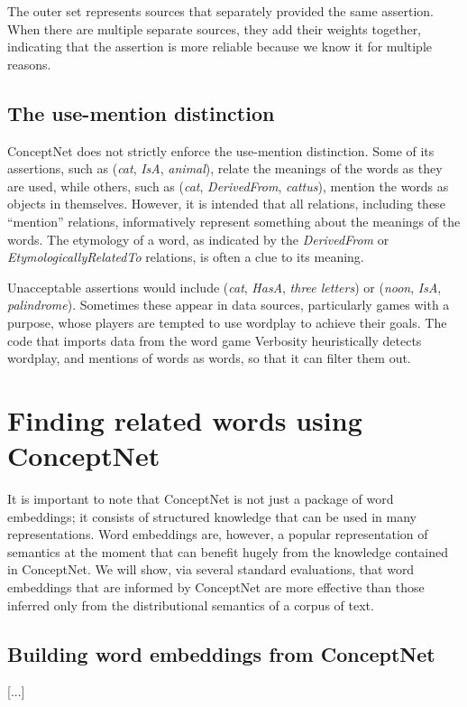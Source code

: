 \documentclass[letterpaper]{article}
\begin{document}
The outer set represents sources that separately provided the same
assertion. When there are multiple separate sources, they add their
weights together, indicating that the assertion is more reliable because
we know it for multiple reasons.


\subsection{The use-mention distinction}

ConceptNet does not strictly enforce the use-mention distinction. Some
of its assertions, such as (\emph{cat}, \emph{IsA}, \emph{animal}),
relate the meanings of the words as they are used, while others, such as
(\emph{cat}, \emph{DerivedFrom}, \emph{cattus}), mention the words as
objects in themselves. However, it is intended that all relations,
including these ``mention'' relations, informatively represent something
about the meanings of the words. The etymology of a word, as indicated
by the \emph{DerivedFrom} or \emph{EtymologicallyRelatedTo} relations,
is often a clue to its meaning.

Unacceptable assertions would include (\emph{cat}, \emph{HasA},
\emph{three letters}) or (\emph{noon}, \emph{IsA}, \emph{palindrome}).
Sometimes these appear in data sources, particularly games with a
purpose, whose players are tempted to use wordplay to achieve their
goals. The code that imports data from the word game Verbosity
heuristically detects wordplay, and mentions of words as words, so that
it can filter them out.


\section{Finding related words using ConceptNet}
\label{finding-related-words-using-conceptnet}

It is important to note that ConceptNet is not just a package of word
embeddings; it consists of structured knowledge that can be used in many
representations.  Word embeddings are, however, a popular representation of
semantics at the moment that can benefit hugely from the knowledge contained in
ConceptNet. We will show, via several standard evaluations, that word
embeddings that are informed by ConceptNet are more effective than those
inferred only from the distributional semantics of a corpus of text.

\subsection{Building word embeddings from ConceptNet}
[...] %
\end{document}
